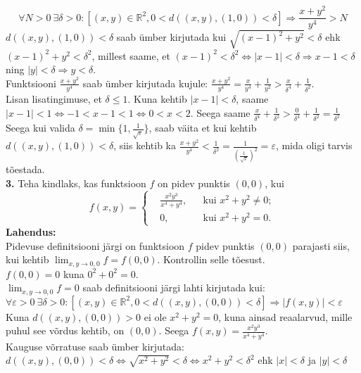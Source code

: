 \documentclass{article}
\begin{document}
\begin{equation*}
\forall N>0\ \exists\delta>0:[(x,y)\in\mathbb{R}^2,0<d((x,y),(1,0))<\delta]\Rightarrow\frac{x+y^2}{y^4}>N
\end{equation*}
$d((x,y),(1,0))<\delta$ saab ümber kirjutada kui $\sqrt{(x-1)^2+y^2}<\delta$ ehk $(x-1)^2+y^2<\delta^2$, millest saame, et $(x-1)^2<\delta^2\Leftrightarrow |x-1|<\delta\Rightarrow x-1<\delta$ ning $|y|<\delta\Rightarrow y<\delta$.\\
Funktsiooni $\frac{x+y^2}{y^4}$ saab ümber kirjutada kujule: $\frac{x+y^2}{y^4}=\frac{x}{y^4}+\frac{1}{y^2}>\frac{x}{\delta^4}+\frac{1}{\delta^2}$.\\
Lisan lisatingimuse, et $\delta\leq1$. Kuna kehtib $|x-1|<\delta$, saame $|x-1|<1\Leftrightarrow -1<x-1<1\Leftrightarrow 0<x<2$. Seega saame $\frac{x}{\delta^4}+\frac{1}{\delta^2}>\frac{0}{\delta^4}+\frac{1}{\delta^2}=\frac{1}{\delta^2}$\\
Seega kui valida $\delta=\min\{1,\frac{1}{\sqrt{\varepsilon}}\}$, saab väita et kui kehtib $d((x,y),(1,0))<\delta$, siis kehtib ka $\frac{x+y^2}{y^4}<\frac{1}{\delta^2}=\frac{1}{(\frac{1}{\sqrt{\varepsilon}})^2}=\varepsilon$, mida oligi tarvis tõestada.
\pagebreak\\
\textbf{3.} Teha kindlaks, kas funktsioon $f$ on pidev punktis $(0,0)$, kui
\begin{equation*}
f(x,y)=
\left\{
\begin{aligned}
&\frac{x^2y^3}{x^4+y^4}, && \text{kui } x^2+y^2\neq0;\\
&0, && \text{kui } x^2+y^2=0.
\end{aligned}
\right.
\end{equation*}
\textbf{Lahendus:}\\
Pidevuse definitsiooni järgi on funktsioon $f$ pidev punktis $(0,0)$ parajasti siis, kui kehtib $\lim_{x,y\to 0,0}f=f(0,0)$. Kontrollin selle tõesust.\\
$f(0,0)=0$ kuna $0^2+0^2=0$.\\
$\lim_{x,y\to 0,0}f=0$ saab definitsiooni järgi lahti kirjutada kui:\\
$\forall\varepsilon>0\ \exists\delta>0: [(x,y)\in\mathbb{R}^2, 0<d((x,y),(0,0))<\delta]\Rightarrow |f(x,y)|<\varepsilon$\\
Kuna $d((x,y),(0,0))>0$ ei ole $x^2+y^2=0$, kuna ainsad reaalarvud, mille puhul see võrdus kehtib, on $(0,0)$. Seega $f(x,y)=\frac{x^2y^3}{x^4+y^4}$.\\
Kauguse võrratuse saab ümber kirjutada: $d((x,y),(0,0))<\delta \Leftrightarrow \sqrt{x^2+y^2}<\delta \Leftrightarrow x^2+y^2<\delta^2$ ehk $|x|<\delta$ ja $|y|<\delta$
\end{document}
